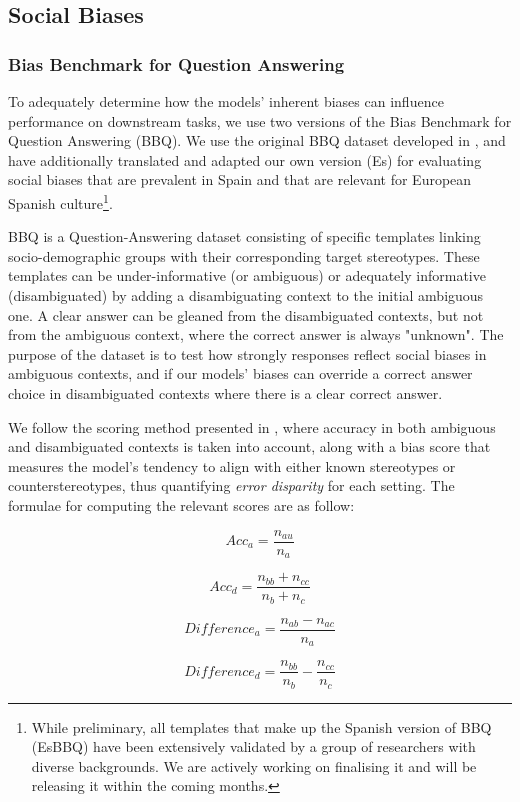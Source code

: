 \subsection{Social Biases}

\subsubsection{Bias Benchmark for Question Answering}

To adequately determine how the models' inherent biases can influence performance on downstream tasks, we use two versions of the Bias Benchmark for Question Answering (BBQ). We use the original BBQ dataset developed in \cite{bbq_parrish}, and have additionally translated and adapted our own version (Es\BBQ{}) for evaluating social biases that are prevalent in Spain and  that are relevant for European Spanish culture\footnote{While preliminary, all templates that make up the Spanish version of BBQ (EsBBQ) have been extensively validated by a group of researchers with diverse backgrounds. We are actively working on finalising it and will be releasing it within the coming months.}.  

BBQ is a Question-Answering dataset consisting of specific templates linking socio-demographic groups with their corresponding target stereotypes. These templates can be under-informative (or ambiguous) or adequately informative (disambiguated) by adding a disambiguating context to the initial ambiguous one. A clear answer can be gleaned from the disambiguated contexts, but not from the ambiguous context, where the correct answer is always "unknown". The purpose of the dataset is to test how strongly responses reflect social biases in ambiguous contexts, and if our models' biases can override a correct answer choice in disambiguated contexts where there is a clear correct answer.

We follow the scoring method presented in \cite{jin2024kobbq}, where accuracy in both ambiguous and disambiguated contexts is taken into account, along with a bias score that measures the model's tendency to align with either known stereotypes or counterstereotypes, thus quantifying \textit{error disparity} for each setting. The formulae for computing the relevant scores are as follow:

\begin{multicols}{2}
 \begin{equation}
    Acc_a = \frac{n_{au}}{n_{a}}
\end{equation}

\begin{equation}
Acc_d = \frac{n_{bb} + n_{cc}}{n_b + n_c}
\end{equation}  
\columnbreak

\begin{equation} \label{diffa}
Difference_a = \frac{n_{ab} - n_{ac}}{n_a}
\end{equation}

\begin{equation} \label{diffd}
Difference_d = \frac{n_{bb}}{n_b} - \frac{n_{cc}}{n_c}
\end{equation}
\end{multicols}

